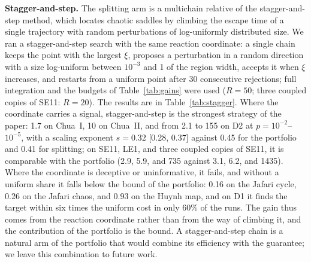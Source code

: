 \textbf{Stagger-and-step.} The splitting arm is a multichain relative of the stagger-and-step method,\cite{SweetNusseYorke2001} which locates chaotic saddles by climbing the escape time of a single trajectory with random perturbations of log-uniformly distributed size. We ran a stagger-and-step search with the same reaction coordinate: a single chain keeps the point with the largest $\xi$, proposes a perturbation in a random direction with a size log-uniform between $10^{-3}$ and 1 of the region width, accepts it when $\xi$ increases, and restarts from a uniform point after 30 consecutive rejections; full integration and the budgets of Table~\ref{tab:gains} were used ($R=50$; three coupled copies of SE11: $R=20$). The results are in Table~\ref{tab:stagger}. Where the coordinate carries a signal, stagger-and-step is the strongest strategy of the paper: 1.7 on Chua~I, 10 on Chua~II, and from 2.1 to 155 on D2 at $p=10^{-2}$--$10^{-5}$, with a scaling exponent $s=0.32$ [0.28, 0.37] against 0.45 for the portfolio and 0.41 for splitting; on SE11, LE1, and three coupled copies of SE11, it is comparable with the portfolio (2.9, 5.9, and 735 against 3.1, 6.2, and 1435). Where the coordinate is deceptive or uninformative, it fails, and without a uniform share it falls below the bound of the portfolio: 0.16 on the Jafari cycle, 0.26 on the Jafari chaos, and 0.93 on the Huynh map, and on D1 it finds the target within six times the uniform cost in only 60\% of the runs. The gain thus comes from the reaction coordinate rather than from the way of climbing it, and the contribution of the portfolio is the bound. A stagger-and-step chain is a natural arm of the portfolio that would combine its efficiency with the guarantee; we leave this combination to future work.

